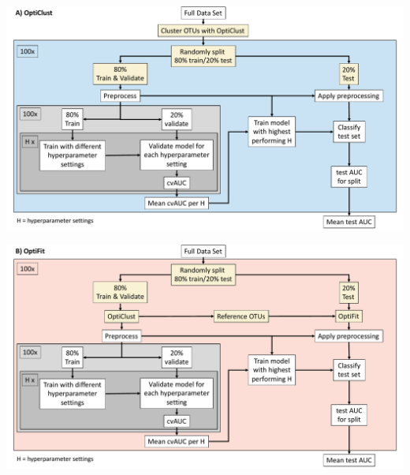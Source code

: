 \documentclass[
]{article}
\begin{document}
\includegraphics{../exploratory/figures/figure1_a.pdf}

\includegraphics{../exploratory/figures/figure1_b.pdf}
\end{document}
